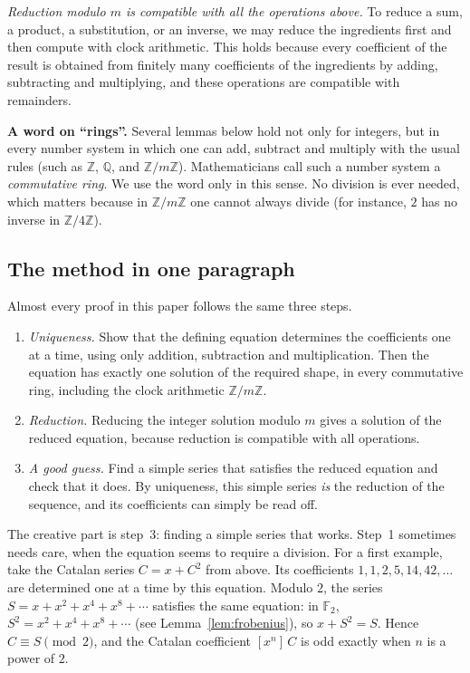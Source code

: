 \documentclass[11pt,a4paper]{article}
\theoremstyle{definition}
\theoremstyle{remark}
\newcommand{\Z}{\mathbb{Z}}
\newcommand{\Q}{\mathbb{Q}}
\newcommand{\F}{\mathbb{F}}
\newcommand{\coeff}[2]{[x^{#1}]\,#2}
\newcommand{\para}[1]{\par\medskip\noindent\textbf{#1}\enspace}
\begin{document}
\emph{Reduction modulo $m$ is compatible with all the operations above.} To reduce a sum, a product, a substitution, or
an inverse, we may reduce the ingredients first and then compute with clock arithmetic. This holds because every
coefficient of the result is obtained from finitely many coefficients of the ingredients by adding, subtracting and
multiplying, and these operations are compatible with remainders.

\para{A word on ``rings''.} Several lemmas below hold not only for integers, but in every number system in
which one can add, subtract and multiply with the usual rules (such as $\Z$, $\Q$, and $\Z/m\Z$). Mathematicians call
such a number system a \emph{commutative ring}. We use the word only in this sense. No division is ever needed, which
matters because in $\Z/m\Z$ one cannot always divide (for instance, $2$ has no inverse in $\Z/4\Z$).

\subsection{The method in one paragraph}
Almost every proof in this paper follows the same three steps.
\begin{enumerate}
\item \emph{Uniqueness.} Show that the defining equation determines the coefficients one at a time, using only
addition, subtraction and multiplication. Then the equation has exactly one solution of the required shape, in every
commutative ring, including the clock arithmetic $\Z/m\Z$.
\item \emph{Reduction.} Reducing the integer solution modulo $m$ gives a solution of the reduced equation,
because reduction is compatible with all operations.
\item \emph{A good guess.} Find a simple series that satisfies the reduced equation and check that it does. By uniqueness,
this simple series \emph{is} the reduction of the sequence, and its coefficients can simply be read off.
\end{enumerate}
The creative part is step~3: finding a simple series that works. Step~1 sometimes needs care, when the equation seems to
require a division.
For a first example, take the Catalan series $C=x+C^2$ from above. Its coefficients $1,1,2,5,14,42,\dots$ are
determined one at a time by this equation. Modulo $2$, the series $S=x+x^2+x^4+x^8+\cdots$ satisfies the same
equation: in $\F_2$, $S^2=x^2+x^4+x^8+\cdots$ (see Lemma~\ref{lem:frobenius}), so $x+S^2=S$. Hence $C\equiv S\pmod2$,
and the Catalan coefficient $\coeff{n}{C}$ is odd exactly when $n$ is a power of $2$.
\end{document}
